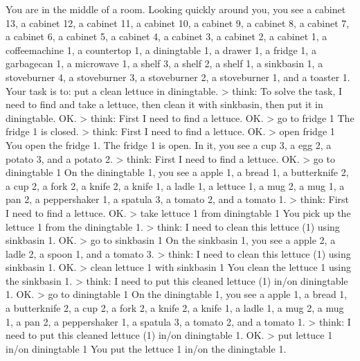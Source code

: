 \documentclass[
]{article}
\newenvironment{Shaded}{}{}
\newcommand{\NormalTok}[1]{#1}
\begin{document}
\begin{Shaded}
\begin{Highlighting}[]
\NormalTok{You are in the middle of a room. Looking quickly around you, you see a cabinet 13, a cabinet 12, a cabinet 11, a cabinet 10, a cabinet 9, a cabinet 8, a cabinet 7, a cabinet 6, a cabinet 5, a cabinet 4, a cabinet 3, a cabinet 2, a cabinet 1, a coffeemachine 1, a countertop 1, a diningtable 1, a drawer 1, a fridge 1, a garbagecan 1, a microwave 1, a shelf 3, a shelf 2, a shelf 1, a sinkbasin 1, a stoveburner 4, a stoveburner 3, a stoveburner 2, a stoveburner 1, and a toaster 1. Your task is to: put a clean lettuce in diningtable.}
\NormalTok{\textgreater{} think: To solve the task, I need to find and take a lettuce, then clean it with sinkbasin, then put it in diningtable.}
\NormalTok{OK.}
\NormalTok{\textgreater{} think: First I need to find a lettuce.}
\NormalTok{OK.}
\NormalTok{\textgreater{} go to fridge 1}
\NormalTok{The fridge 1 is closed.}
\NormalTok{\textgreater{} think: First I need to find a lettuce.}
\NormalTok{OK.}
\NormalTok{\textgreater{} open fridge 1}
\NormalTok{You open the fridge 1. The fridge 1 is open. In it, you see a cup 3, a egg 2, a potato 3, and a potato 2.}
\NormalTok{\textgreater{} think: First I need to find a lettuce.}
\NormalTok{OK.}
\NormalTok{\textgreater{} go to diningtable 1}
\NormalTok{On the diningtable 1, you see a apple 1, a bread 1, a butterknife 2, a cup 2, a fork 2, a knife 2, a knife 1, a ladle 1, a lettuce 1, a mug 2, a mug 1, a pan 2, a peppershaker 1, a spatula 3, a tomato 2, and a tomato 1.}
\NormalTok{\textgreater{} think: First I need to find a lettuce.}
\NormalTok{OK.}
\NormalTok{\textgreater{} take lettuce 1 from diningtable 1}
\NormalTok{You pick up the lettuce 1 from the diningtable 1.}
\NormalTok{\textgreater{} think: I need to clean this lettuce (1) using sinkbasin 1.}
\NormalTok{OK.}
\NormalTok{\textgreater{} go to sinkbasin 1}
\NormalTok{On the sinkbasin 1, you see a apple 2, a ladle 2, a spoon 1, and a tomato 3.}
\NormalTok{\textgreater{} think: I need to clean this lettuce (1) using sinkbasin 1.}
\NormalTok{OK.}
\NormalTok{\textgreater{} clean lettuce 1 with sinkbasin 1}
\NormalTok{You clean the lettuce 1 using the sinkbasin 1.}
\NormalTok{\textgreater{} think: I need to put this cleaned lettuce (1) in/on diningtable 1.}
\NormalTok{OK.}
\NormalTok{\textgreater{} go to diningtable 1}
\NormalTok{On the diningtable 1, you see a apple 1, a bread 1, a butterknife 2, a cup 2, a fork 2, a knife 2, a knife 1, a ladle 1, a mug 2, a mug 1, a pan 2, a peppershaker 1, a spatula 3, a tomato 2, and a tomato 1.}
\NormalTok{\textgreater{} think: I need to put this cleaned lettuce (1) in/on diningtable 1.}
\NormalTok{OK.}
\NormalTok{\textgreater{} put lettuce 1 in/on diningtable 1}
\NormalTok{You put the lettuce 1 in/on the diningtable 1. }
\end{Highlighting}
\end{Shaded}
\end{document}

